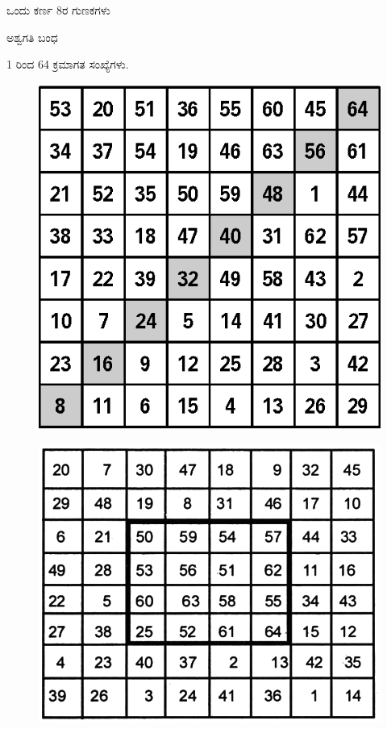 ಒಂದು ಕರ್ಣ 8ರ ಗುಣಕಗಳು

ಅಶ್ವಗತಿ ಬಂಧ

1 ರಿಂದ 64 ಕ್ರಮಾಗತ ಸಂಖ್ಯೆಗಳು.
\begin{figure}[H]
\includegraphics[scale=.9]{src/figures/chap6/fig6-21.eps}
\end{figure}
\begin{figure}[H]
\includegraphics[scale=.95]{src/figures/chap6/fig6-22.jpg}
\end{figure}

